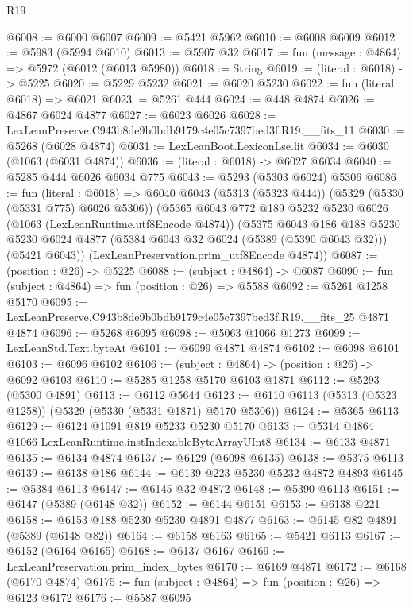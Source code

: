 \begin{lexlean}{R19}
\begin{coremodule}
@6008 := @6000 @6007
@6009 := @5421 @5962
@6010 := @6008 @6009
@6012 := @5983 (@5994 @6010)
@6013 := @5907 @32
@6017 := fun (message : @4864) => @5972 (@6012 (@6013 @5980))
@6018 := String
@6019 := (literal : @6018) -> @5225
@6020 := @5229 @5232
@6021 := @6020 @5230
@6022 := fun (literal : @6018) => @6021
@6023 := @5261 @444
@6024 := @448 @4874
@6026 := @4867 @6024 @4877
@6027 := @6023 @6026
@6028 := LexLeanPreserve.C943b8de9b0bdb9179c4e05c7397bed3f.R19.__fits_11
@6030 := @5268 (@6028 @4874)
@6031 := LexLeanBoot.LexiconLse.lit
@6034 := @6030 (@1063 (@6031 @4874))
@6036 := (literal : @6018) -> @6027 @6034
@6040 := @5285 @444 @6026 @6034 @775
@6043 := @5293 (@5303 @6024) @5306
@6086 := fun (literal : @6018) =>
  @6040
    @6043
    (@5313 (@5323 @444))
    (@5329 (@5330 (@5331 @775) @6026 @5306))
    (@5365
      @6043
      @772
      @189
      @5232
      @5230
      @6026
      (@1063 (LexLeanRuntime.utf8Encode @4874))
      (@5375
        @6043
        @186
        @188
        @5230
        @5230
        @6024
        @4877
        (@5384 @6043 @32 @6024 (@5389 (@5390 @6043 @32)))
        (@5421 @6043))
      (LexLeanPreservation.prim_utf8Encode @4874))
@6087 := (position : @26) -> @5225
@6088 := (subject : @4864) -> @6087
@6090 := fun (subject : @4864) => fun (position : @26) => @5588
@6092 := @5261 @1258 @5170
@6095 := LexLeanPreserve.C943b8de9b0bdb9179c4e05c7397bed3f.R19.__fits_25 @4871 @4874
@6096 := @5268 @6095
@6098 := @5063 @1066 @1273
@6099 := LexLeanStd.Text.byteAt
@6101 := @6099 @4871 @4874
@6102 := @6098 @6101
@6103 := @6096 @6102
@6106 := (subject : @4864) -> (position : @26) -> @6092 @6103
@6110 := @5285 @1258 @5170 @6103 @1871
@6112 := @5293 (@5300 @4891)
@6113 := @6112 @5644
@6123 := @6110 @6113 (@5313 (@5323 @1258)) (@5329 (@5330 (@5331 @1871) @5170 @5306))
@6124 := @5365 @6113
@6129 := @6124 @1091 @819 @5233 @5230 @5170
@6133 := @5314 @4864 @1066 LexLeanRuntime.instIndexableByteArrayUInt8
@6134 := @6133 @4871
@6135 := @6134 @4874
@6137 := @6129 (@6098 @6135)
@6138 := @5375 @6113
@6139 := @6138 @186
@6144 := @6139 @223 @5230 @5232 @4872 @4893
@6145 := @5384 @6113
@6147 := @6145 @32 @4872
@6148 := @5390 @6113
@6151 := @6147 (@5389 (@6148 @32))
@6152 := @6144 @6151
@6153 := @6138 @221
@6158 := @6153 @188 @5230 @5230 @4891 @4877
@6163 := @6145 @82 @4891 (@5389 (@6148 @82))
@6164 := @6158 @6163
@6165 := @5421 @6113
@6167 := @6152 (@6164 @6165)
@6168 := @6137 @6167
@6169 := LexLeanPreservation.prim_index_bytes
@6170 := @6169 @4871
@6172 := @6168 (@6170 @4874)
@6175 := fun (subject : @4864) => fun (position : @26) => @6123 @6172
@6176 := @5587 @6095

\end{coremodule}
\end{lexlean}
